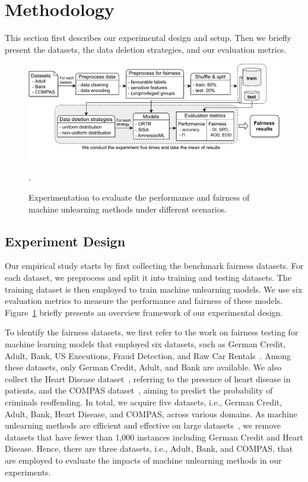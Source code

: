 \section{Methodology}
\label{sec:method}

This section first describes our experimental design and setup. Then we briefly present the datasets, the data deletion strategies, and our evaluation metrics. 

\begin{figure}[t!]
  \centering
  \includegraphics[scale=0.8]{assets/flowchart_ver9.pdf}
  \caption{Experimentation to evaluate the performance and fairness of machine unlearning methods under different scenarios. 
  }.
  \label{fig:design}
\end{figure}

\subsection{Experiment Design}
\label{sec:design}

Our empirical study starts by first collecting the benchmark fairness datasets. For each dataset, we preprocess and split it into training and testing datasets. The training dataset is then employed to train machine unlearning models. We use six evaluation metrics to measure the performance and fairness of these models. Figure~\ref{fig:design} briefly presents an overview framework of our experimental design. 

To identify the fairness datasets, we first refer to the work on fairness testing for machine learning models that employed six datasets, such as German Credit, Adult, Bank, US Executions, Fraud Detection, and Raw Car Rentals~\cite{aggarwal2019black}. Among these datasets, only German Credit, Adult, and Bank are available. We also collect the Heart Disease dataset~\cite{heart}, referring to the presence of heart disease in patients, and the COMPAS dataset~\cite{compas}, aiming to predict the probability of criminals reoffending. In total, we acquire five datasets, i.e., German Credit, Adult, Bank, Heart Disease, and COMPAS, across various domains. As machine unlearning methods are efficient and effective on large datasets~\cite{sisa, amnesiac}, we remove datasets that have fewer than 1,000 instances including German Credit and Heart Disease. Hence, there are three datasets, i.e., Adult, Bank, and COMPAS, that are employed to evaluate the impacts of machine unlearning methods in our experiments. 

